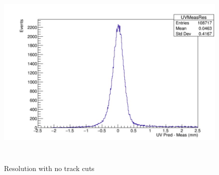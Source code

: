 \documentclass[./Thesis]{subfiles}
\begin{document}
\begin{figure}
	\centerline{\includegraphics[height=95mm]{BadSpacialRes.jpeg}}
	\caption[Spacial Resolution with no track cuts]{ Resolution with no track cuts}
	\label{fig:badRes}
\end{figure}
\end{document}
